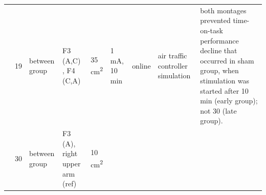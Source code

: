 \documentclass[11pt,english,]{memoir}
\begin{document}
\begin{longtable}[]{@{}lllllllll@{}}
\begin{minipage}[t]{0.08\columnwidth}\raggedright
\textcite{Nelson2014}\strut
\end{minipage} & \begin{minipage}[t]{0.02\columnwidth}\raggedright
19\strut
\end{minipage} & \begin{minipage}[t]{0.04\columnwidth}\raggedright
between
group\strut
\end{minipage} & \begin{minipage}[t]{0.13\columnwidth}\raggedright
F3 (A,C) , F4 (C,A)\strut
\end{minipage} & \begin{minipage}[t]{0.03\columnwidth}\raggedright
35
cm\textsuperscript{2}\strut
\end{minipage} & \begin{minipage}[t]{0.05\columnwidth}\raggedright
1 mA, 10
min\strut
\end{minipage} & \begin{minipage}[t]{0.06\columnwidth}\raggedright
online\strut
\end{minipage} & \begin{minipage}[t]{0.11\columnwidth}\raggedright
air traffic controller
simulation\strut
\end{minipage} & \begin{minipage}[t]{0.24\columnwidth}\raggedright
both montages prevented time-on-task performance
decline that occurred in sham group, when stimulation
was started after 10 min (early group); not 30 (late
group).\strut
\end{minipage}\tabularnewline
\begin{minipage}[t]{0.08\columnwidth}\raggedright
\textcite{McIntire2014}\strut
\end{minipage} & \begin{minipage}[t]{0.02\columnwidth}\raggedright
30\strut
\end{minipage} & \begin{minipage}[t]{0.04\columnwidth}\raggedright
between
group\strut
\end{minipage} & \begin{minipage}[t]{0.13\columnwidth}\raggedright
F3 (A), right upper arm (ref)\strut
\end{minipage} & \begin{minipage}[t]{0.03\columnwidth}\raggedright
10
cm\textsuperscript{2}\strut
\end{minipage} & \begin{minipage}[t]{0.05\columnwidth}\raggedright

\end{minipage}
\end{longtable}
\end{document}
